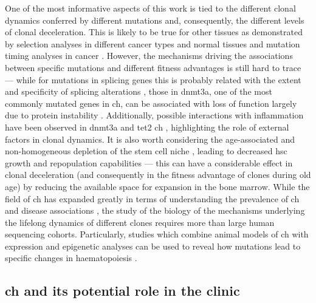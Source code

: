 One of the most informative aspects of this work is tied to the different clonal dynamics conferred by different mutations and, consequently, the different levels of clonal deceleration. This is likely to be true for other tissues as demonstrated by selection analyses in different cancer types and normal tissues \cite{Martincorena2017-ii,Martincorena2018-yp,Yoshida2020-zi} and mutation timing analyses in cancer \cite{Gerstung2020-kf}. However, the mechanisms driving the associations between specific mutations and different fitness advantages is still hard to trace --- while for mutations in splicing genes this is probably related with the extent and specificity of splicing alterations \cite{Daubner2012-zp,Kim2015-qz}, those in \ac{dnmt3a}, one of the most commonly mutated genes in \ac{ch}, can be associated with loss of function largely due to protein instability \cite{Huang2021-dz}. Additionally, possible interactions with inflammation have been observed in \ac{dnmt3a} and \ac{tet2} \ac{ch} \cite{Hormaechea_Agulla2019-cd,Hormaechea-Agulla2021-kr,Cai2018-yi}, highlighting the role of external factors in clonal dynamics. It is also worth considering the age-associated and non-homogeneous depletion of the stem cell niche \cite{Crane2017-hl}, leading to decreased \ac{hsc} growth and repopulation capabilities \cite{Tanaka2017-pu,Wang2017-rg} --- this can have a considerable effect in clonal deceleration (and consequently in the fitness advantage of clones during old age) by reducing the available space for expansion in the bone marrow. While the field of \ac{ch} has expanded greatly in terms of understanding the prevalence of \ac{ch} and disease associations \cite{Jaiswal2014-rl,Genovese2014-eu,Abelson2018-wh}, the study of the biology of the mechanisms underlying the lifelong dynamics of different clones requires more than large human sequencing cohorts. Particularly, studies which combine animal models of \ac{ch} with expression and epigenetic analyses can be used to reveal how mutations lead to specific changes in haematopoiesis \cite{Asada2021-wd}. 

\subsection{\Ac{ch} and its potential role in the clinic} 

